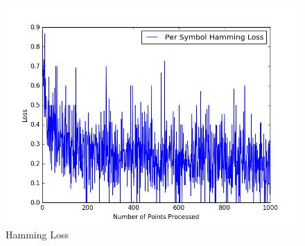 \documentclass[twoside,11pt]{article}
\theoremstyle{definition}
\begin{document}
\begin{figure}[h]
\centering
\includegraphics[width=5in]{hammingLoss1.png}
\caption{Hamming Loss}
\end{figure}
\end{document}
